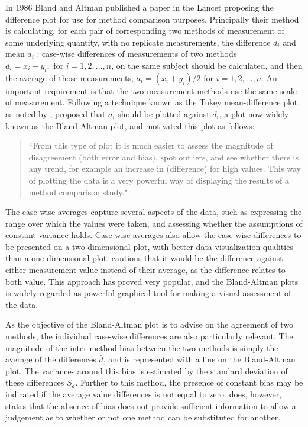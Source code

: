 \documentclass[12pt, a4paper]{report}
\theoremstyle{plain}
\theoremstyle{definition}
\theoremstyle{remark}
\begin{document}
	
In 1986 Bland and Altman published a paper in the Lancet proposing the difference plot for use for method comparison purposes. Principally their method is calculating, for each pair of corresponding two methods of measurement of some underlying quantity, with no replicate measurements, the difference $d_i$ and mean $a_i$ : case-wise differences of measurements of two methods $d_{i} =
x_{i}-y_{i}, \mbox{ for }i=1,2,\dots,n$, on the same subject
should be calculated, and then the average of those measurements, 
$a_{i} = (x_{i} + y_{i})/2 \mbox{ for }i=1,2,\dots, n$. An important requirement is that the two measurement methods use the same scale of measurement. Following a technique known as the Tukey mean-difference plot, as noted by \citet{kozak2014including}, \citet{BA83} proposed that $a_i$ should be plotted against $d_i$, a plot now widely known as the Bland-Altman plot, and motivated this plot as follows:
	\begin{quote}
		``From this type of plot it is much easier to assess the magnitude
		of disagreement (both error and bias), spot outliers, and see
		whether there is any trend, for example an increase in (difference) for high values. This way of plotting the data is a very powerful way of displaying the results of a method comparison study."
	\end{quote}
	
	The case wise-averages capture several aspects of the data, such as expressing the range over which the values were taken, and assessing whether the assumptions of constant variance holds. Case-wise averages also allow the case-wise differences to be presented on a two-dimensional plot, with better data visualization qualities than a one dimensional plot. \citet{BA86}
	cautions that it would be the difference against either measurement value instead of their average, as the difference relates to both value. This approach has proved very popular, and the Bland-Altman plots is widely regarded as powerful graphical tool for making a visual assessment of the data.
	
	As the objective of the Bland-Altman plot is to advise on the agreement of two methods, the individual case-wise differences are also particularly relevant.	The magnitude of the inter-method bias between the two methods is simply the average of the differences $\bar{d}$, and is represented with a line on the Bland-Altman plot.  The variances around this bias is estimated by the standard deviation of these differences $S_{d}$. Further to this method, the presence of constant bias may be
	indicated if the average value differences is not equal to zero. \citet{BA86} does, however, states that the absence of bias does not provide sufficient information to allow a	judgement as to whether or not one method can be substituted for
	another.
	
\end{document}
